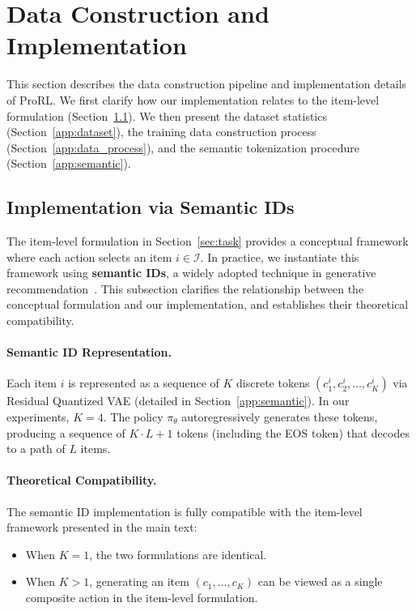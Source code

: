 \section{Data Construction and Implementation}
\label{app:data}

This section describes the data construction pipeline and implementation details of ProRL. We first clarify how our implementation relates to the item-level formulation (Section~\ref{app:semantic_id}). We then present the dataset statistics (Section~\ref{app:dataset}), the training data construction process (Section~\ref{app:data_process}), and the semantic tokenization procedure (Section~\ref{app:semantic}).

\subsection{Implementation via Semantic IDs}
\label{app:semantic_id}

The item-level formulation in Section~\ref{sec:task} provides a conceptual framework where each action selects an item $i \in \mathcal{I}$. In practice, we instantiate this framework using \textbf{semantic IDs}, a widely adopted technique in generative recommendation~\cite{zhai2024actions,hou2025surveygenerativerecommendationdata}. This subsection clarifies the relationship between the conceptual formulation and our implementation, and establishes their theoretical compatibility.

\paragraph{Semantic ID Representation.} Each item $i$ is represented as a sequence of $K$ discrete tokens $(c_1^i, c_2^i, \ldots, c_K^i)$ via Residual Quantized VAE (detailed in Section~\ref{app:semantic}). In our experiments, $K=4$. The policy $\pi_\theta$ autoregressively generates these tokens, producing a sequence of $K \cdot L + 1$ tokens (including the EOS token) that decodes to a path of $L$ items.

\paragraph{Theoretical Compatibility.} The semantic ID implementation is fully compatible with the item-level framework presented in the main text:
\begin{itemize}
    \item When $K=1$, the two formulations are identical.
    \item When $K>1$, generating an item $(c_1, \ldots, c_K)$ can be viewed as a single composite action in the item-level formulation.
\end{itemize}


